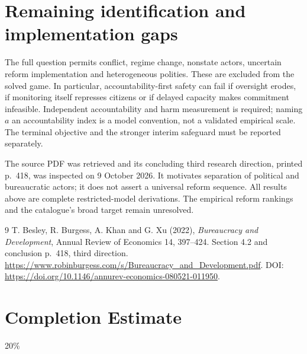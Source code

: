 \documentclass[11pt]{article}
\begin{document}
\section{Remaining identification and implementation gaps}
The full question permits conflict, regime change, nonstate actors,
uncertain reform implementation and heterogeneous polities. These are
excluded from the solved game. In particular, accountability-first safety
can fail if oversight erodes, if monitoring itself represses citizens or
if delayed capacity makes commitment infeasible. Independent accountability
and harm measurement is required; naming $a$ an accountability index is a
model convention, not a validated empirical scale. The terminal objective
and the stronger interim safeguard must be reported separately.

The source PDF was retrieved and its concluding third research direction,
printed p.~418, was inspected on 9 October 2026. It motivates separation
of political and bureaucratic actors; it does not assert a universal reform
sequence. All results above are complete restricted-model derivations.
The empirical reform rankings and the catalogue's broad target remain
unresolved.
\begin{thebibliography}{9}
 T. Besley, R. Burgess, A. Khan and G. Xu (2022),
\emph{Bureaucracy and Development}, Annual Review of Economics 14,
397--424. Section 4.2 and conclusion p.~418, third direction.
\url{https://www.robinburgess.com/s/Bureaucracy_and_Development.pdf}.
DOI: \url{https://doi.org/10.1146/annurev-economics-080521-011950}.
\end{thebibliography}

\section{Completion Estimate}
20\%
\end{document}
